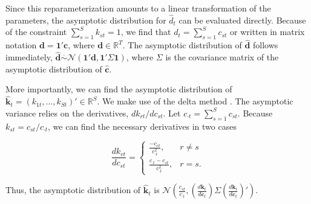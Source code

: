 \documentclass[smallextended]{svjour3}
\begin{document}
Since this reparameterization amounts to a linear transformation of the parameters, the asymptotic distribution for $\hat{d}_t$ can be evaluated directly.  Because of the constraint $\sum_{s=1}^S k_{st} = 1$, we find that $d_t = \sum_{s=1}^S c_{st}$ or written in matrix notation  $\mathbf{d} = \mathbf{1}' \mathbf{c}$, where $\mathbf{d} \in \mathbb{R}^T$.  The asymptotic distribution of $\mathbf{\hat{d}}$ follows immediately, $\mathbf{\hat{d}} \stackrel{\cdot}{\sim} \mathcal{N}(\mathbf{1}'\mathbf{d}, \mathbf{1}'\Sigma\mathbf{1})$, where $\Sigma$ is the covariance matrix of the asymptotic distribution of $\mathbf{\hat{c}}$.  

More importantly, we can find the asymptotic distribution of $\mathbf{\hat{k}}_t = (k_{1t}, \ldots, k_{St})' \in \mathbb{R}^S$.  We make use of the delta method \citep{Serfling:2001}.  The asymptotic variance relies on the derivatives, $d k_{rt} / d c_{st}$.  Let $c_{\cdot t} = \sum_{s=1}^S c_{st}$.  Because $k_{st} = c_{st}/ c_{\cdot t}$, we can find the necessary derivatives in two cases

\[
  \frac{d k_{rt}}{d c_{st}} =
\begin{cases}
  \frac{-c_{rt}}{c_{\cdot t}^2}, & r \ne s \\
  \frac{c_{\cdot t} - c_{st}}{c_{\cdot t}^2}, & r = s.
\end{cases}
\]

\noindent  Thus, the asymptotic distribution of $\mathbf{\hat{k}}_{t}$ is $\mathcal{N}(\frac{c_{st}}{c_{\cdot t}}, (\frac{d \mathbf{k}_t}{d \mathbf{c}_t}) \Sigma (\frac{d \mathbf{k}_t}{d \mathbf{c}_t})')$. 


\end{document}
